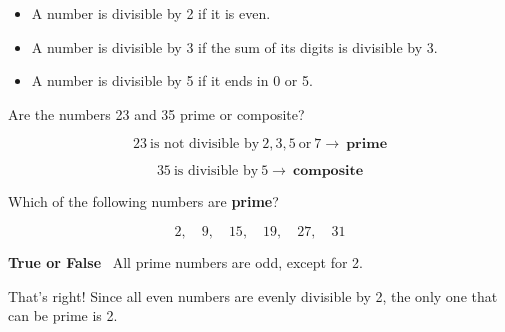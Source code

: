 \documentclass{ximera}[font=12pt]  %
\begin{document}

\begin{itemize}
    \item A number is divisible by 2 if it is even.
    \item A number is divisible by 3 if the sum of its digits is divisible by 3.
    \item A number is divisible by 5 if it ends in 0 or 5.
\end{itemize}

\begin{example}

Are the numbers 23 and 35 prime or composite?

\begin{explanation}

  \[ 23 \ \textrm{is not divisible by}  \ 2, 3, 5 \ \textrm{or} \ 7 \rightarrow \ \textbf{prime} \] 

  \[ 35 \ \textrm{is divisible by} \ 5 \rightarrow \ \textbf{composite} \]

\end{explanation}
\end{example}

\begin{problem}
Which of the following numbers are \textbf{prime}?

  \[ 2, \quad 9, \quad 15, \quad 19, \quad 27, \quad 31 \]

 
  \begin{selectAll}
  \end{selectAll}

\end{problem}


\begin{problem}  \textcolor{accessibleOrange}{\textbf{True or False}} \  All prime numbers are odd, except for 2.

\begin{multipleChoice}
\end{multipleChoice}

\begin{feedback}[correct]
That's right!  Since all even numbers are evenly divisible by 2, the only one that can be prime is 2.
\end{feedback}

\end{problem}
\end{document}
